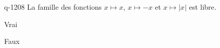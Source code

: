 \begin{truefalse}{q-1208}
La famille des fonctions $x\mapsto x$, $x\mapsto -x$ et $x\mapsto |x|$ est libre.
\item Vrai
\item* Faux
\end{truefalse}

